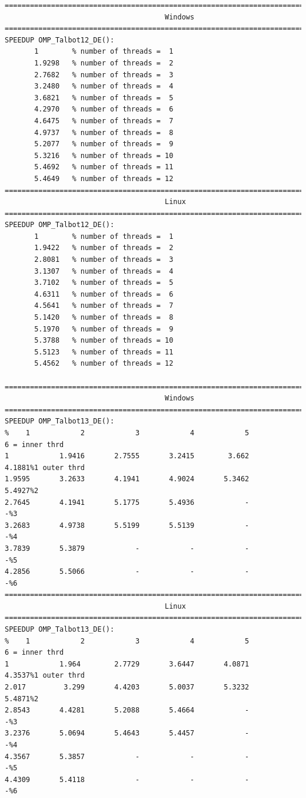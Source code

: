 \documentclass[a4paper,10pt]{report}%
\begin{document}
\begin{lstlisting}
====================================================================================
                                      Windows
====================================================================================
SPEEDUP OMP_Talbot12_DE():
       1        % number of threads =  1
       1.9298   % number of threads =  2
       2.7682   % number of threads =  3
       3.2480   % number of threads =  4
       3.6821   % number of threads =  5
       4.2970   % number of threads =  6
       4.6475   % number of threads =  7
       4.9737   % number of threads =  8
       5.2077   % number of threads =  9
       5.3216   % number of threads = 10
       5.4692   % number of threads = 11
       5.4649   % number of threads = 12
====================================================================================
                                      Linux
====================================================================================
SPEEDUP OMP_Talbot12_DE():
       1        % number of threads =  1
       1.9422   % number of threads =  2
       2.8081   % number of threads =  3
       3.1307   % number of threads =  4
       3.7102   % number of threads =  5
       4.6311   % number of threads =  6
       4.5641   % number of threads =  7
       5.1420   % number of threads =  8
       5.1970   % number of threads =  9
       5.3788   % number of threads = 10
       5.5123   % number of threads = 11
       5.4562   % number of threads = 12

====================================================================================
                                      Windows
====================================================================================
SPEEDUP OMP_Talbot13_DE():
%    1            2            3            4            5            6 = inner thrd
1            1.9416       2.7555       3.2415        3.662       4.1881%1 outer thrd
1.9595       3.2633       4.1941       4.9024       5.3462       5.4927%2
2.7645       4.1941       5.1775       5.4936            -            -%3
3.2683       4.9738       5.5199       5.5139            -            -%4
3.7839       5.3879            -            -            -            -%5
4.2856       5.5066            -            -            -            -%6
====================================================================================
                                      Linux
====================================================================================
SPEEDUP OMP_Talbot13_DE():
%    1            2            3            4            5            6 = inner thrd
1            1.964        2.7729       3.6447       4.0871       4.3537%1 outer thrd
2.017         3.299       4.4203       5.0037       5.3232       5.4871%2
2.8543       4.4281       5.2088       5.4664            -            -%3
3.2376       5.0694       5.4643       5.4457            -            -%4
4.3567       5.3857            -            -            -            -%5
4.4309       5.4118            -            -            -            -%6
\end{lstlisting}
\end{document}
